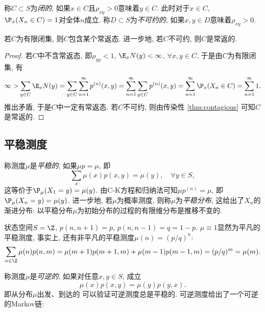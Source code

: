 \documentclass[a4paper, 10pt]{ctexart}
\begin{document}
称$C \subset S$为\emph{闭的}, 如果$x \in C$且$\rho_{xy} > 0$意味着$y \in C$. 
此时对于$x \in C$, $\P_x(X_n \in C) = 1$对全体$n$成立. 
称$D \subset S$为\emph{不可约的}, 如果$x, y \in D$意味着$\rho_{xy} > 0$. 

\begin{theorem}
	若$C$为有限闭集, 则$C$包含某个常返态. 
	进一步地, 若$C$不可约, 则$C$是常返的. 
\end{theorem}
\begin{proof}
	若$C$中不含常返态, 即$\rho_{yy} < 1$, $\E_x N(y) < \infty$, $\forall x, y \in C$. 
	于是由$C$为有限闭集, 有
	\begin{equation*}
		\infty
		> \sum_{y \in C} \E_x N(y) 
		= \sum_{y \in C} \sum_{n=1}^{\infty} p^{(n)}(x, y)
		= \sum_{n=1}^{\infty} \sum_{y \in C} p^{(n)}(x, y)
		= \sum_{n=1}^{\infty} \P_x(X_n \in C) 
		= \sum_{n=1}^{\infty} 1.
	\end{equation*}
	推出矛盾, 于是$C$中一定有常返态. 
	若$C$不可约, 则由传染性 \ref{thm:contagious} 可知$C$是常返的.
\end{proof}


\subsection{平稳测度}

\noindent
称测度$\mu$是\emph{平稳的}, 如果$\mu p = \mu$, 即
\begin{equation*}
	\sum_{x} \mu(x) p(x, y) = \mu(y), \quad \forall y \in S, 
\end{equation*}
这等价于$\P_\mu(X_1 = y) = \mu(y)$. 
由C-K方程和归纳法可知$\mu p^{(n)} = \mu$, 即$\P_{\mu} (X_n = y) = \mu(y)$. 
进一步地, 若$\mu$为概率测度, 则称$\mu$为\emph{平稳分布}, 这给出了$X_n$的渐进分布: 以平稳分布$\mu$为初始分布的过程的有限维分布是推移不变的. 

\begin{example}[$\Z^1$上的非对称随机游走]
	状态空间$S = \Z$, $p(n, n+1) = p$, $p(n, n-1) = q = 1-p$. 
	$\mu \equiv 1$显然为平凡的平稳测度, 事实上, 还有非平凡的平稳测度$\mu(n) = (p/q)^n$: 
	\begin{equation*}
		\sum_{n \in \Z} \mu(n) p(n, m)
		= \mu(m+1) p(m+1, m) + \mu(m-1) p(m-1, m)
		= (p/q)^m = \mu(m). 
	\end{equation*}
\end{example}

称测度$\mu$是\emph{可逆的}, 如果对任意$x, y \in S$, 成立
\begin{equation*}
	\mu(x) p(x, y) = \mu(y) p(y, x). 
\end{equation*}
即从分布$\mu$出发、到达的
可以验证可逆测度总是平稳的.
可逆测度给出了一个可逆的Markov链: 
\end{document}
